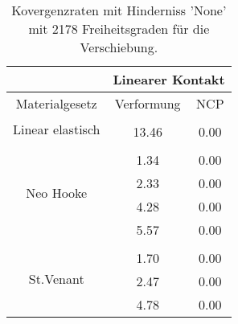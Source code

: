 \begin{table} 
\centering 
\begin{tabular}{c|cc|} 
\cline{2-3} 
 & \multicolumn{2}{|c|}{Linearer Kontakt} \\ 
\hline 
\multicolumn{1}{|c|}{Materialgesetz} & \multicolumn{1}{c|}{Verformung} & \multicolumn{1}{c|}{NCP} \\ 
\hline 
\multicolumn{1}{|c|}{\multirow{2}{*}{Linear elastisch}} &\multicolumn{1}{|c|}{} & \multicolumn{1}{|c|}{} \\ 
\multicolumn{1}{|c|}{} & \multicolumn{1}{|c|}{     13.46} & \multicolumn{1}{|c|}{      0.00} \\ 
\hline 
\multicolumn{1}{|c|}{\multirow{5}{*}{Neo Hooke}} &\multicolumn{1}{|c|}{} & \multicolumn{1}{|c|}{} \\ 
\multicolumn{1}{|c|}{} & \multicolumn{1}{|c|}{      1.34} & \multicolumn{1}{|c|}{      0.00} \\ 
\multicolumn{1}{|c|}{} & \multicolumn{1}{|c|}{      2.33} & \multicolumn{1}{|c|}{      0.00} \\ 
\multicolumn{1}{|c|}{} & \multicolumn{1}{|c|}{      4.28} & \multicolumn{1}{|c|}{      0.00} \\ 
\multicolumn{1}{|c|}{} & \multicolumn{1}{|c|}{      5.57} & \multicolumn{1}{|c|}{      0.00} \\ 
\hline 
\multicolumn{1}{|c|}{\multirow{4}{*}{St.Venant}} &\multicolumn{1}{|c|}{} & \multicolumn{1}{|c|}{} \\ 
\multicolumn{1}{|c|}{} & \multicolumn{1}{|c|}{      1.70} & \multicolumn{1}{|c|}{      0.00} \\ 
\multicolumn{1}{|c|}{} & \multicolumn{1}{|c|}{      2.47} & \multicolumn{1}{|c|}{      0.00} \\ 
\multicolumn{1}{|c|}{} & \multicolumn{1}{|c|}{      4.78} & \multicolumn{1}{|c|}{      0.00} \\ 
\hline 
\end{tabular}\caption{Kovergenzraten mit Hinderniss 'None' mit 2178 Freiheitsgraden für die Verschiebung.}\label{tab:Rate_None_level4}
\end{table} 
